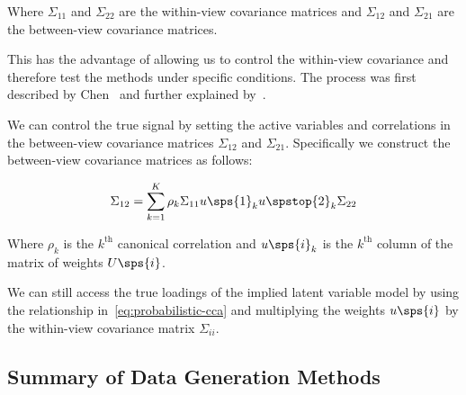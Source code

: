 Where $\Sigma_{11}$ and $\Sigma_{22}$ are the within-view covariance matrices and $\Sigma_{12}$ and $\Sigma_{21}$ are the between-view covariance matrices.

This has the advantage of allowing us to control the within-view covariance and therefore test the methods under specific conditions.
The process was first described by Chen~\citep{chen2013sparse} and further explained by~\citep{suo2017sparse}.

We can control the true signal by setting the active variables and correlations in the between-view covariance matrices $\Sigma_{12}$ and $\Sigma_{21}$.
Specifically we construct the between-view covariance matrices as follows:

\begin{align}
    \Sigma_{12}=\sum_{k=1}^{K}\rho_k\Sigma_{11}u\sps{1}_{k}u\spstop{2}_k\Sigma_{22}
\end{align}

Where $\rho_k$ is the $k^{\text{th}}$ canonical correlation and $u\sps{i}_k$ is the $k^{\text{th}}$ column of the matrix of weights $U\sps{i}$.

We can still access the true loadings of the implied latent variable model by using the relationship in~\ref{eq:probabilistic-cca} and multiplying the weights $u\sps{i}$ by the within-view covariance matrix $\Sigma_{ii}$.

\subsection{Summary of Data Generation Methods}

